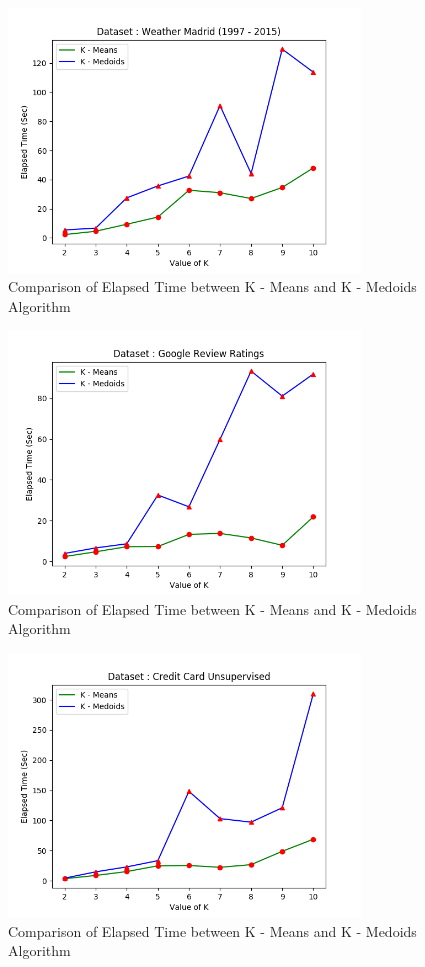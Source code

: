 \documentclass[12pt]{article}
\begin{document}
\begin{figure}[h]
	\centering
	\includegraphics[width = 0.75\linewidth, height = 7cm]{Weather.png}
	\caption{Comparison of Elapsed Time between K - Means and K - Medoids Algorithm}
	\label{fig:weather}
\end{figure}

\begin{figure}[h]
	\centering
	\includegraphics[width = 0.75\linewidth, height = 7cm]{Google.png}
	\caption{Comparison of Elapsed Time between K - Means and K - Medoids Algorithm}
	\label{fig:google}
\end{figure}

\begin{figure}[h]
	\centering
	\includegraphics[width = 0.75\linewidth, height = 7cm]{CreditCard.png}
	\caption{Comparison of Elapsed Time between K - Means and K - Medoids Algorithm}
	\label{fig:credit}
\end{figure}
\end{document}
